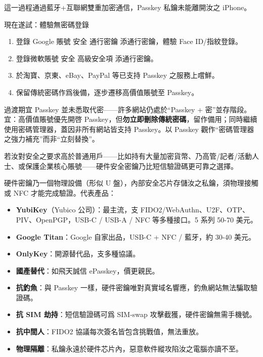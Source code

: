 這一過程通過藍牙+互聯網雙重加密通信，Passkey 私鑰未能離開汝之 iPhone。

\begin{tcbpractice}{現在遂試：體驗無密碼登錄}
\begin{enumerate}
  \item 登錄 Google 賬號 安全 通行密鑰 添通行密鑰，體驗 Face ID/指紋登錄。
  \item 登錄微軟賬號 安全 高級安全項 添通行密鑰。
  \item 於淘寶、京東、eBay、PayPal 等已支持 Passkey 之服務上嚐鮮。
  \item 保留傳統密碼作爲後備，逐步遷移高價值賬號至 Passkey。
\end{enumerate}

\end{tcbpractice}

\begin{tcbwarn}{過渡期宜}
Passkey 並未悉取代密——許多網站仍處於“Passkey + 密”並存階段。宜：高價值賬號優先開啓 Passkey，但\textbf{勿立即刪除傳統密碼}，留作備用；同時繼續使用密碼管理器，蓋因非所有網站皆支持 Passkey。以 Passkey 觀作“密碼管理器之強力補充”而非“立刻替換”。

\end{tcbwarn}


若汝對安全之要求高於普通用戶——比如持有大量加密貨幣、乃高管/記者/活動人士、或保護企業核心賬號——硬件安全密鑰乃比短信驗證碼更可靠之選擇。


硬件密鑰乃一個物理設備（形似 U 盤），內部安全芯片存儲汝之私鑰，須物理接觸或 NFC 才能完成驗證。代表產品：

\begin{itemize}
  \item \textbf{YubiKey}（Yubico 公司）：最主流，支 FIDO2/WebAuthn、U2F、OTP、PIV、OpenPGP，USB-C / USB-A / NFC 等多種接口。5 系列 50-70 美元。
  \item \textbf{Google Titan}：Google 自家出品，USB-C + NFC / 藍牙，約 30-40 美元。
  \item \textbf{OnlyKey}：開源替代品，支多種協議。
  \item \textbf{國產替代}：如飛天誠信 ePasskey，價更親民。
\end{itemize}


\begin{itemize}
  \item \textbf{抗釣魚}：與 Passkey 一樣，硬件密鑰唯對真實域名響應，釣魚網站無法騙取驗證碼。
  \item \textbf{抗 SIM 劫持}：短信驗證碼可爲 SIM-swap 攻擊截獲，硬件密鑰無需手機號。
  \item \textbf{抗中間人}：FIDO2 協議每次簽名皆包含挑戰值，無法重放。
  \item \textbf{物理隔離}：私鑰永遠於硬件芯片內，惡意軟件縱攻陷汝之電腦亦讀不至。
\end{itemize}

